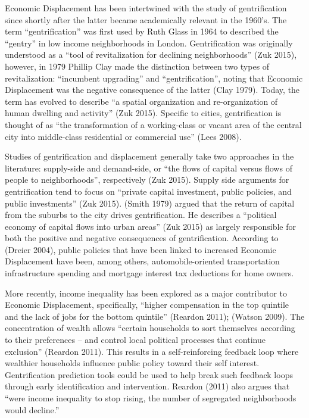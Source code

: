 \documentclass[]{article}
\begin{document}
Economic Displacement has been intertwined with the study of
gentrification since shortly after the latter became academically
relevant in the 1960's. The term ``gentrification'' was first used by
Ruth Glass in 1964 to described the ``gentry'' in low income
neighborhoods in London. Gentrification was originally understood as a
``tool of revitalization for declining neighborhoods'' (Zuk 2015),
however, in 1979 Phillip Clay made the distinction between two types of
revitalization: ``incumbent upgrading'' and ``gentrification'', noting
that Economic Displacement was the negative consequence of the latter
(Clay 1979). Today, the term has evolved to describe ``a spatial
organization and re-organization of human dwelling and activity'' (Zuk
2015). Specific to cities, gentrification is thought of as ``the
transformation of a working-class or vacant area of the central city
into middle-class residential or commercial use'' (Lees 2008).

Studies of gentrification and displacement generally take two approaches
in the literature: supply-side and demand-side, or ``the flows of
capital versus flows of people to neighborhoods'', respectively (Zuk
2015). Supply side arguments for gentrification tend to focus on
``private capital investment, public policies, and public investments''
(Zuk 2015). (Smith 1979) argued that the return of capital from the
suburbs to the city drives gentrification. He describes a ``political
economy of capital flows into urban areas'' (Zuk 2015) as largely
responsible for both the positive and negative consequences of
gentrification. According to (Dreier 2004), public policies that have
been linked to increased Economic Displacement have been, among others,
automobile-oriented transportation infrastructure spending and mortgage
interest tax deductions for home owners.

More recently, income inequality has been explored as a major
contributor to Economic Displacement, specifically, ``higher
compensation in the top quintile and the lack of jobs for the bottom
quintile'' (Reardon 2011); (Watson 2009). The concentration of wealth
allows ``certain households to sort themselves according to their
preferences -- and control local political processes that continue
exclusion'' (Reardon 2011). This results in a self-reinforcing feedback
loop where wealthier households influence public policy toward their
self interest. Gentrification prediction tools could be used to help
break such feedback loops through early identification and intervention.
Reardon (2011) also argues that ``were income inequality to stop rising,
the number of segregated neighborhoods would decline.''
\end{document}
